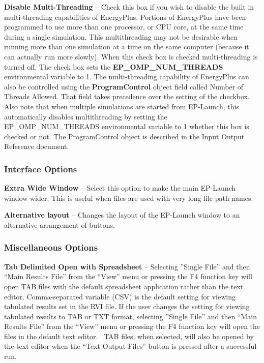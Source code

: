 \textbf{Disable Multi-Threading} -- Check this box if you wish to disable the built in multi-threading capabilities of EnergyPlus. Portions of EnergyPlus have been programmed to use more than one processor, or CPU core, at the same time during a single simulation. This multithreading may not be desirable when running more than one simulation at a time on the same computer (because it can actually run more slowly). When this check box is checked multi-threading is turned off. The check box sets the \textbf{EP\_OMP\_NUM\_THREADS} environmental variable to 1. The multi-threading capability of EnergyPlus can also be controlled using the \textbf{ProgramControl} object field called Number of Threads Allowed. That field takes precedence over the setting of the checkbox. Also note that when multiple simulations are started from EP-Launch, this automatically disables multithreading by setting the EP\_OMP\_NUM\_THREADS environmental variable to 1 whether this box is checked or not. The ProgramControl object is described in the Input Output Reference document.

\subsubsection{Interface Options}\label{interface-options}

\textbf{Extra Wide Window} -- Select this option to make the main EP-Launch window wider. This is useful when files are used with very long file path names.

\textbf{Alternative layout} -- Changes the layout of the EP-Launch window to an alternative arrangement of buttons.

\subsubsection{Miscellaneous Options}\label{miscellaneous-options}

\textbf{Tab Delimited Open with Spreadsheet} -- Selecting ''Single File'' and then ``Main Results File'' from the ``View'' menu or pressing the F4 function key will open TAB files with the default spreadsheet application rather than the text editor. Comma-separated variable (CSV) is the default setting for viewing tabulated results set in the RVI file. If the user changes the setting for viewing tabulated results to TAB or TXT format, selecting ''Single File'' and then ``Main Results File'' from the ``View'' menu or pressing the F4 function key will open the files in the default text editor.~ TAB files, when selected, will also be opened by the text editor when the ``Text Output Files'' button is pressed after a successful run.

